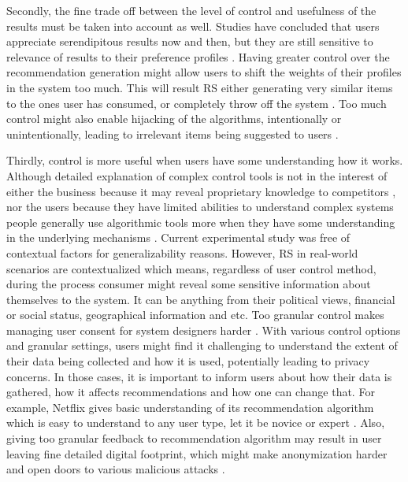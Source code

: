 \documentclass[a4paper,12pt]{article}
\begin{document}
Secondly, the fine trade off between the level of control and usefulness of the results must be taken into account as well. Studies have concluded that users appreciate serendipitous results now and then, but they are still sensitive to relevance of results to their preference profiles \citep{kotkovSurveySerendipityRecommender2016}. Having greater control over the recommendation generation might allow users to shift the  weights of their profiles in the system too much. This will result RS either generating very similar items to the ones user has consumed, or completely throw off the system \citep{mantovani2019meta}. Too much control might also enable hijacking of the algorithms, intentionally or unintentionally, leading to irrelevant items being suggested to users \citep{xing2013take}. 

Thirdly, control is more useful when users have some understanding how it works. Although detailed explanation of complex control tools is not in the interest of either the business because it may reveal proprietary knowledge to competitors \citep{lubit2001tacit}, nor the users because they have limited abilities to understand complex systems \citep{kahneman1979interpretation} people generally use algorithmic tools more when they have some understanding in the underlying mechanisms \citep{guidotti2018survey}. Current experimental study was free of contextual factors for generalizability reasons. However, RS in real-world scenarios are contextualized which means, regardless of user control method, during the process consumer might reveal some sensitive information about themselves to the system. It can be anything from their political views, financial or social status, geographical information and etc. Too granular control makes managing user consent for system designers harder \citep{belanger2011privacy}. With various control options and granular settings, users might find it challenging to understand the extent of their data being collected and how it is used, potentially leading to privacy concerns. In those cases, it is important to inform users about how their data is gathered, how it affects recommendations and how one can change that. For example, Netflix gives basic understanding of its recommendation algorithm which is easy to understand to any user type, let it be novice or expert \citep{netflix_help_page}. Also, giving too granular feedback to recommendation algorithm may result in user leaving fine detailed digital footprint, which might make anonymization harder and open doors to various malicious attacks \citep{sweeney2002k}.
\end{document}
